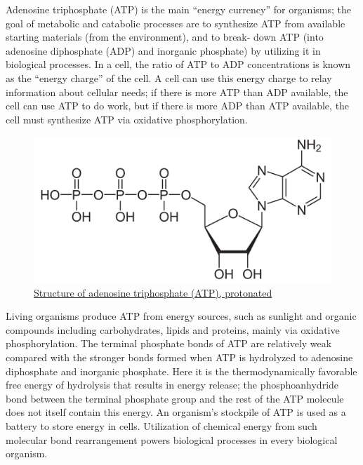 Adenosine triphosphate (ATP) is the main ``energy currency'' for organisms; the goal of metabolic and catabolic processes are to synthesize ATP from available starting materials (from the environment), and to break- down ATP (into adenosine diphosphate (ADP) and inorganic phosphate) by utilizing it in biological processes. In a cell, the ratio of ATP to ADP concentrations is known as the ``energy charge'' of the cell. A cell can use this energy charge to relay information about cellular needs; if there is more ATP than ADP available, the cell can use ATP to do work, but if there is more ADP than ATP available, the cell must synthesize ATP via oxidative phosphorylation.



\begin{figure}

{\centering \includegraphics[width=0.7\linewidth]{./figures/bioenergetics/Adenosintriphosphat_protoniert} 

}

\caption{\href{https://commons.wikimedia.org/wiki/File:Adenosintriphosphat_protoniert.svg}{Structure of adenosine triphosphate (ATP), protonated}}\label{fig:atpstrucform}
\end{figure}

Living organisms produce ATP from energy sources, such as sunlight and organic compounds including carbohydrates, lipids and proteins, mainly via oxidative phosphorylation. The terminal phosphate bonds of ATP are relatively weak compared with the stronger bonds formed when ATP is hydrolyzed to adenosine diphosphate and inorganic phosphate. Here it is the thermodynamically favorable free energy of hydrolysis that results in energy release; the phosphoanhydride bond between the terminal phosphate group and the rest of the ATP molecule does not itself contain this energy. An organism's stockpile of ATP is used as a battery to store energy in cells. Utilization of chemical energy from such molecular bond rearrangement powers biological processes in every biological organism.

